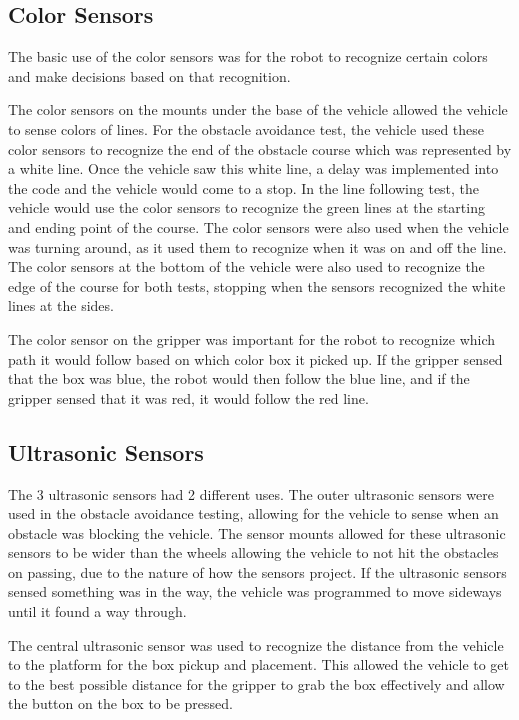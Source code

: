 \documentclass[11pt]{report}
\begin{document}
\subsection{Color Sensors}
The basic use of the color sensors was for the robot to recognize certain colors and make decisions based on that recognition. 

\par The color sensors on the mounts under the base of the vehicle allowed the vehicle to sense colors of lines. For the obstacle avoidance test, the vehicle used these color sensors to recognize the end of the obstacle course which was represented by a white line. Once the vehicle saw this white line, a delay was implemented into the code and the vehicle would come to a stop. In the line following test, the vehicle would use the color sensors to recognize the green lines at the starting and ending point of the course. The color sensors were also used when the vehicle was turning around, as it used them to recognize when it was on and off the line. The color sensors at the bottom of the vehicle were also used to recognize the edge of the course for both tests, stopping when the sensors recognized the white lines at the sides.

\par The color sensor on the gripper was important for the robot to recognize which path it would follow based on which color box it picked up. If the gripper sensed that the box was blue, the robot would then follow the blue line, and if the gripper sensed that it was red, it would follow the red line. 

\subsection{Ultrasonic Sensors}
The 3 ultrasonic sensors had 2 different uses. The outer ultrasonic sensors were used in the obstacle avoidance testing, allowing for the vehicle to sense when an obstacle was blocking the vehicle. The sensor mounts allowed for these ultrasonic sensors to be wider than the wheels allowing the vehicle to not hit the obstacles on passing, due to the nature of how the sensors project. If the ultrasonic sensors sensed something was in the way, the vehicle was programmed to move sideways until it found a way through. 

\par The central ultrasonic sensor was used to recognize the distance from the vehicle to the platform for the box pickup and placement. This allowed the vehicle to get to the best possible distance for the gripper to grab the box effectively and allow the button on the box to be pressed. 
\end{document}
